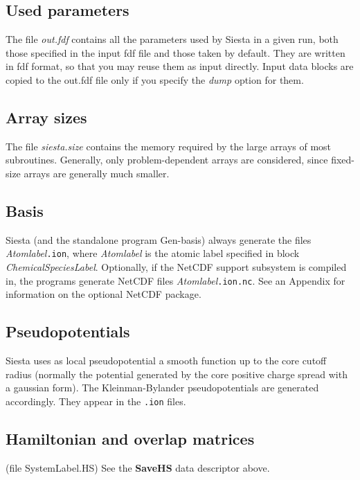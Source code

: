 \documentclass[11pt]{article}
\begin{document}
\subsection{Used parameters}
The file {\it out.fdf} contains all the parameters used by {\sc Siesta}
in a given run, both those specified in the input fdf file and
those taken by default. They are written in fdf format, so that
you may reuse them as input directly. Input data blocks are 
copied to the out.fdf file only if you specify the {\it dump} option
for them.


\subsection{Array sizes}
 
The file {\it siesta.size} contains the memory required by the
large arrays of most subroutines. Generally, only problem-dependent
arrays are considered, since fixed-size arrays are generally much smaller.


\subsection{Basis}
{\sc Siesta} (and the standalone program {\sc Gen-basis}) 
always generate the files
{\it Atomlabel}{\tt .ion}, where {\it Atomlabel} is the atomic label
specified in block {\it ChemicalSpeciesLabel}.  Optionally, if
the NetCDF support subsystem is compiled in, the programs generate
NetCDF files 
{\it Atomlabel}{\tt .ion.nc}.
See an Appendix for information on the optional NetCDF package.

\subsection{Pseudopotentials}
 {\sc Siesta} uses as local pseudopotential a smooth
function up to the core cutoff radius (normally the potential generated
by the core positive charge spread with a gaussian form). The
Kleinman-Bylander pseudopotentials are generated
accordingly. They appear in the {\tt .ion} files.


\subsection{Hamiltonian and overlap matrices}
(file SystemLabel.HS) See the {\bf SaveHS} data descriptor above.
\end{document}
